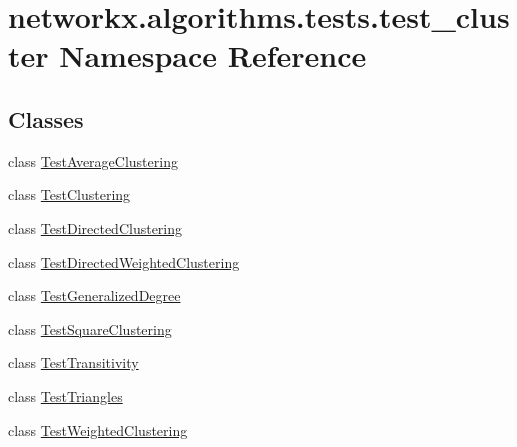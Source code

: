 \hypertarget{namespacenetworkx_1_1algorithms_1_1tests_1_1test__cluster}{}\section{networkx.\+algorithms.\+tests.\+test\+\_\+cluster Namespace Reference}
\label{namespacenetworkx_1_1algorithms_1_1tests_1_1test__cluster}
\subsection*{Classes}
\begin{DoxyCompactItemize}
\item 
class \hyperlink{classnetworkx_1_1algorithms_1_1tests_1_1test__cluster_1_1TestAverageClustering}{Test\+Average\+Clustering}
\item 
class \hyperlink{classnetworkx_1_1algorithms_1_1tests_1_1test__cluster_1_1TestClustering}{Test\+Clustering}
\item 
class \hyperlink{classnetworkx_1_1algorithms_1_1tests_1_1test__cluster_1_1TestDirectedClustering}{Test\+Directed\+Clustering}
\item 
class \hyperlink{classnetworkx_1_1algorithms_1_1tests_1_1test__cluster_1_1TestDirectedWeightedClustering}{Test\+Directed\+Weighted\+Clustering}
\item 
class \hyperlink{classnetworkx_1_1algorithms_1_1tests_1_1test__cluster_1_1TestGeneralizedDegree}{Test\+Generalized\+Degree}
\item 
class \hyperlink{classnetworkx_1_1algorithms_1_1tests_1_1test__cluster_1_1TestSquareClustering}{Test\+Square\+Clustering}
\item 
class \hyperlink{classnetworkx_1_1algorithms_1_1tests_1_1test__cluster_1_1TestTransitivity}{Test\+Transitivity}
\item 
class \hyperlink{classnetworkx_1_1algorithms_1_1tests_1_1test__cluster_1_1TestTriangles}{Test\+Triangles}
\item 
class \hyperlink{classnetworkx_1_1algorithms_1_1tests_1_1test__cluster_1_1TestWeightedClustering}{Test\+Weighted\+Clustering}
\end{DoxyCompactItemize}
